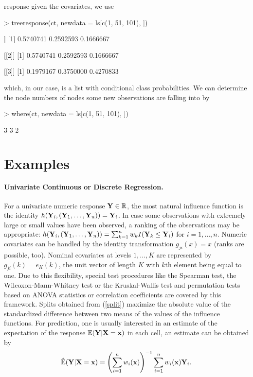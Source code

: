 \documentclass[letter]{article}
\begin{document}
response given the covariates, we use
\begin{Schunk}
\begin{Sinput}
> treeresponse(ct, newdata = ls[c(1, 51, 101), ])
\end{Sinput}
\begin{Soutput}
[[1]]
[1] 0.5740741 0.2592593 0.1666667

[[2]]
[1] 0.5740741 0.2592593 0.1666667

[[3]]
[1] 0.1979167 0.3750000 0.4270833
\end{Soutput}
\end{Schunk}
which, in our case, is a list with conditional class probabilities.
We can determine the node numbers of nodes some new observations are falling
into by
\begin{Schunk}
\begin{Sinput}
> where(ct, newdata = ls[c(1, 51, 101), ])
\end{Sinput}
\begin{Soutput}
[1] 3 3 2
\end{Soutput}
\end{Schunk}

\section{Examples \label{examples}}

\paragraph{Univariate Continuous or Discrete Regression.}
For a univariate numeric response $\mathbf{Y} \in \mathbb{R}$, the most natural influence function
is the identity $h(\mathbf{Y}_i, (\mathbf{Y}_1, \dots, \mathbf{Y}_n)) = \mathbf{Y}_i$. 
In case some observations with extremely large or small values have been
observed, a
ranking of the observations may be appropriate:
$h(\mathbf{Y}_i, (\mathbf{Y}_1, \dots, \mathbf{Y}_n)) = \sum_{k=1}^n w_k I(\mathbf{Y}_k \le \mathbf{Y}_i)$ for $i = 1, \dots,
n$.
Numeric covariates can be handled by the identity transformation 
$g_{ji}(x) = x$ (ranks are possible, too). Nominal covariates at levels $1,
\dots, K$ are
represented by $g_{ji}(k) = e_K(k)$, the unit vector of length $K$ with
$k$th element being equal to one. Due to this flexibility, special test 
procedures like the Spearman test, the 
Wilcoxon-Mann-Whitney test or the Kruskal-Wallis test and permutation tests
based on ANOVA statistics or correlation coefficients
are covered by this framework. Splits obtained from (\ref{split}) maximize the
absolute value of the standardized difference between two means of the
values of the influence functions. 
For prediction, one is usually interested in an estimate of 
the expectation of
the response $\mathbb{E}(\mathbf{Y} | \mathbf{X} = \mathbf{x})$ in each cell, an estimate can be 
obtained by 
\begin{eqnarray*}
\hat{\mathbb{E}}(\mathbf{Y} | \mathbf{X} = \mathbf{x}) = \left(\sum_{i=1}^n w_i(\mathbf{x})\right)^{-1} \sum_{i=1}^n
w_i(\mathbf{x}) \mathbf{Y}_i.
\end{eqnarray*}
\end{document}
